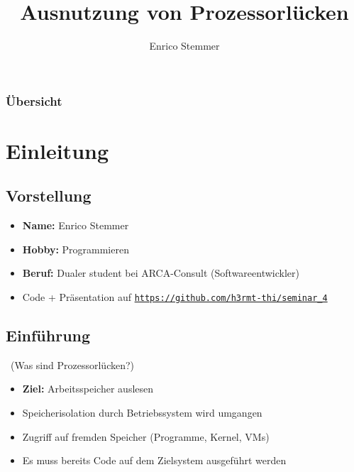 \documentclass[aspectratio=1210]{beamer}
\title{Ausnutzung von Prozessorlücken}
\author{Enrico Stemmer}
\begin{document}
\begin{frame}
	\titlepage
\end{frame}

\begin{frame}
	\frametitle{Übersicht}
	\tableofcontents
\end{frame}

\section{Einleitung}
\subsection{Vorstellung}
\begin{frame}{\insertsubsection}
	\begin{itemize}
		\item \textbf{Name:} Enrico Stemmer
		\item \textbf{Hobby:} Programmieren
		\item \textbf{Beruf:} Dualer student bei ARCA-Consult (Softwareentwickler)
		      \vspace{0.5cm}
		\item Code + Präsentation auf \href{https://github.com/h3rmt-thi/seminar_4}{\texttt{https://github.com/h3rmt-thi/seminar\_4}}
	\end{itemize}
\end{frame}

\subsection{Einführung}
\begin{frame}{\insertsubsection\ (Was sind Prozessorlücken?)}
	\begin{itemize}
		\item \textbf{Ziel:} Arbeitsspeicher auslesen
		\item Speicherisolation durch Betriebssystem wird umgangen
		\item Zugriff auf fremden Speicher (Programme, Kernel, VMs)
		\item Es muss bereits Code auf dem Zielsystem ausgeführt werden
	\end{itemize}
\end{frame}
\end{document}
